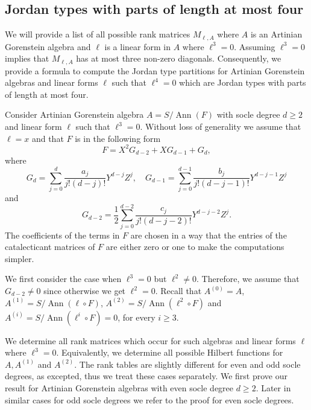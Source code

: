 \documentclass[12pt]{amsart}
\numberwithin{equation}{section}
\theoremstyle{plain} \newtheorem{theorem}{Theorem}[section]
\theoremstyle{definition} \newtheorem{definition}[theorem]{Definition}
\DeclareMathOperator{\ann}{Ann}\DeclareMathOperator{\Char}{char}
\begin{document}
\subsection{Jordan types with parts of length at most four}\label{length3}

We will provide a list of all possible rank matrices $M_{\ell,A}$ where $A$ is an Artinian Gorenstein algebra and $\ell$ is a linear form in $A$ where $\ell^3=0$. 
Assuming  $\ell^3=0$ implies that $M_{\ell,A}$ has at most three  non-zero diagonals. Consequently, we provide a formula to compute the  Jordan type partitions for Artinian Gorenstein algebras and linear forms $\ell$ such that $\ell^4=0$ which are Jordan types with parts of length at most four.

Consider Artinian  Gorenstein algebra $A=S/\ann(F)$ with socle degree $d\geq 2$ and linear form $\ell$ such that $\ell^3=0$. Without loss of generality we assume that $\ell=x$ and that $F$ is in the following form
\begin{equation}\label{F}
F = X^2G_{d-2}+XG_{d-1}+G_d,
\end{equation}
where
$$G_{d}=\sum_{j=0}^{d}\frac{a_{j}}{j!(d-j)!}{Y^{d-j}Z^{j}}, \quad  G_{d-1}=\sum_{j=0}^{d-1}\frac{b_{j}}{j!(d-j-1)!}{Y^{d-j-1}Z^{j}}$$
and 
$$ G_{d-2}=\frac{1}{2}\sum_{j=0}^{d-2}\frac{c_{j}}{j!(d-j-2)!}{Y^{d-j-2}Z^{j}}.$$
The coefficients of the terms in $F$ are chosen in a way that the entries of the catalecticant matrices of $F$ are either zero or one to make the computations simpler.

We first consider the case when $\ell^3=0$ but $\ell^2\neq 0$. Therefore, we assume that  $G_{d-2}\neq 0$ since otherwise we get $\ell^2=0$. Recall that $A^{(0)}=A$, $A^{(1)}=S/\ann(\ell\circ F)$, $A^{(2)}=S/\ann(\ell^2\circ F)$ and $A^{(i)}=S/\ann(\ell^i\circ F)=0$, for every $i\geq 3$.

We determine all rank matrices which occur for such algebras and linear forms $\ell$ where $\ell^3=0$. Equivalently, we determine all possible Hilbert functions for $A, A^{(1)}$ and $A^{(2)}$. The rank tables are slightly different for even  and odd socle degrees, as excepted, thus we treat these cases separately. We first prove our result for Artinian Gorenstein algebras with even socle degree $d\geq 2$. Later in  similar cases for odd socle degrees we refer to the proof for even socle degrees. 
\end{document}
